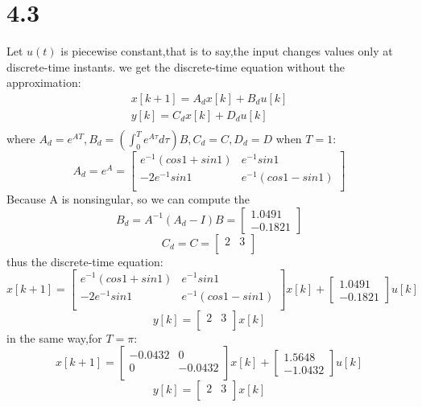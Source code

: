 \documentclass{article}
\begin{document}
\section*{4.3}
Let $u(t)$ is piecewise constant,that is to say,the input changes values only at discrete-time instants.
we get the discrete-time equation without the approximation:
\[
\begin{aligned}
x[k+1]=A_dx[k]+B_du[k]\\
y[k]=C_dx[k]+D_du[k]\\
\end{aligned}    
\]
where $A_d=e^{AT},B_d=(\int_{0}^{T}e^{A\tau}d\tau)B,C_d=C,D_d=D$
when $T=1$:
\[
A_d=e^{A}=
\left[
\begin{array}{cc}
e^{-1}(cos1+sin1) & e^{-1}sin1 \\
-2e^{-1}sin1 & e^{-1}(cos1-sin1)\\
\end{array}
\right]
\]
Because A is nonsingular, so we can compute the
\[
B_d=A^{-1}(A_d-I)B=
\left[
\begin{array}{c}
1.0491\\
-0.1821
\end{array}
\right]    
\]
\[
C_d=C=
\left[
\begin{array}{cc}
2 &3\\
\end{array}
\right] 
\]
thus the discrete-time equation:
\[
x[k+1]=
\left[
\begin{array}{cc}
e^{-1}(cos1+sin1) & e^{-1}sin1 \\
-2e^{-1}sin1 & e^{-1}(cos1-sin1)\\
\end{array}
\right]x[k]+
\left[
\begin{array}{c}
1.0491\\
-0.1821
\end{array}
\right]u[k]
\]
\[
y[k]=
\left[
\begin{array}{cc}
2 &3\\
\end{array}
\right]x[k]
\]
in the same way,for $T=\pi$:
\[
x[k+1]=
\left[
\begin{array}{cc}
-0.0432 & 0 \\
0 & -0.0432\\
\end{array}
\right]x[k]+
\left[
\begin{array}{c}
1.5648\\
-1.0432
\end{array}
\right]u[k]
\]
\[
y[k]=
\left[
\begin{array}{cc}
2 &3\\
\end{array}
\right]x[k]
\]
\end{document}
